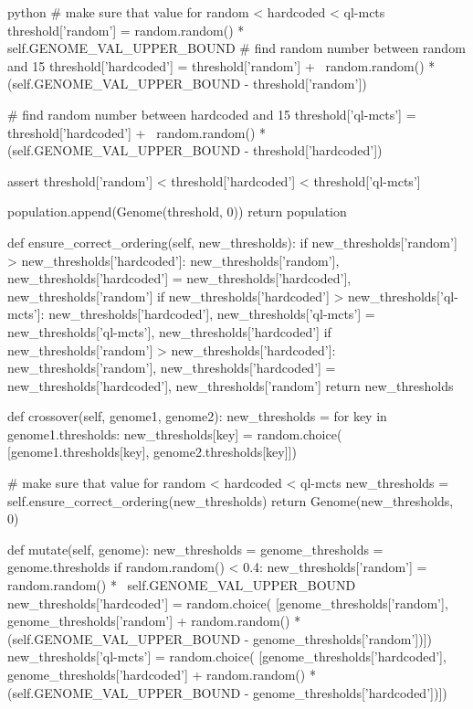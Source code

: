 \begin{mintedbox}{python}
            # make sure that value for random < hardcoded < ql-mcts
            threshold['random'] = random.random() * self.GENOME_VAL_UPPER_BOUND
            # find random number between random and 15
            threshold['hardcoded'] = threshold['random'] + \
                random.random() * (self.GENOME_VAL_UPPER_BOUND -
                                    threshold['random'])

            # find random number between hardcoded and 15
            threshold['ql-mcts'] = threshold['hardcoded'] + \
                random.random() * (self.GENOME_VAL_UPPER_BOUND -
                                    threshold['hardcoded'])

            assert threshold['random'] < threshold['hardcoded'] < threshold['ql-mcts']

            population.append(Genome(threshold, 0))
        return population

    def ensure_correct_ordering(self, new_thresholds):
        if new_thresholds['random'] > new_thresholds['hardcoded']:
            new_thresholds['random'], new_thresholds['hardcoded'] = new_thresholds['hardcoded'], new_thresholds['random']
        if new_thresholds['hardcoded'] > new_thresholds['ql-mcts']:
            new_thresholds['hardcoded'], new_thresholds['ql-mcts'] = new_thresholds['ql-mcts'], new_thresholds['hardcoded']
        if new_thresholds['random'] > new_thresholds['hardcoded']:
            new_thresholds['random'], new_thresholds['hardcoded'] = new_thresholds['hardcoded'], new_thresholds['random']
        return new_thresholds

    def crossover(self, genome1, genome2):
        new_thresholds = {}
        for key in genome1.thresholds:
            new_thresholds[key] = random.choice(
                [genome1.thresholds[key], genome2.thresholds[key]])

        # make sure that value for random < hardcoded < ql-mcts
        new_thresholds = self.ensure_correct_ordering(new_thresholds)
        return Genome(new_thresholds, 0)

    def mutate(self, genome):
        new_thresholds = {}
        genome_thresholds = genome.thresholds
        if random.random() < 0.4:
            new_thresholds['random'] = random.random() * \
                self.GENOME_VAL_UPPER_BOUND
            new_thresholds['hardcoded'] = random.choice(
                [genome_thresholds['random'], genome_thresholds['random'] +
                    random.random() * (self.GENOME_VAL_UPPER_BOUND - genome_thresholds['random'])])
            new_thresholds['ql-mcts'] = random.choice(
                [genome_thresholds['hardcoded'], genome_thresholds['hardcoded'] +
                    random.random() * (self.GENOME_VAL_UPPER_BOUND - genome_thresholds['hardcoded'])])


\end{mintedbox}
